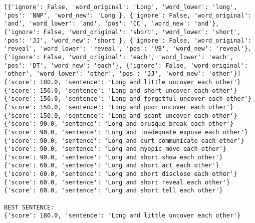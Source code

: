 \documentclass[12pt,a4paper,oneside]{book}
\begin{document}
\begin{verbatim}
[{'ignore': False, 'word_original': 'Long', 'word_lower': 'long', 'pos': 'NNP', 'word_new': 'Long'}, {'ignore': False, 'word_original': 'and', 'word_lower': 'and', 'pos': 'CC', 'word_new': 'and'}, {'ignore': False, 'word_original': 'short', 'word_lower': 'short', 'pos': 'JJ', 'word_new': 'short'}, {'ignore': False, 'word_original': 'reveal', 'word_lower': 'reveal', 'pos': 'VB', 'word_new': 'reveal'}, {'ignore': False, 'word_original': 'each', 'word_lower': 'each', 'pos': 'DT', 'word_new': 'each'}, {'ignore': False, 'word_original': 'other', 'word_lower': 'other', 'pos': 'JJ', 'word_new': 'other'}]
{'score': 180.0, 'sentence': 'Long and little uncover each other'}
{'score': 150.0, 'sentence': 'Long and short uncover each other'}
{'score': 150.0, 'sentence': 'Long and forgetful uncover each other'}
{'score': 150.0, 'sentence': 'Long and poor uncover each other'}
{'score': 150.0, 'sentence': 'Long and scant uncover each other'}
{'score': 90.0, 'sentence': 'Long and brusque break each other'}
{'score': 90.0, 'sentence': 'Long and inadequate expose each other'}
{'score': 90.0, 'sentence': 'Long and curt communicate each other'}
{'score': 90.0, 'sentence': 'Long and myopic move each other'}
{'score': 90.0, 'sentence': 'Long and short show each other'}
{'score': 60.0, 'sentence': 'Long and short act each other'}
{'score': 60.0, 'sentence': 'Long and short disclose each other'}
{'score': 60.0, 'sentence': 'Long and short reveal each other'}
{'score': 60.0, 'sentence': 'Long and short tell each other'}

BEST SENTENCE:
{'score': 180.0, 'sentence': 'Long and little uncover each other'}



\end{verbatim}
\end{document}
